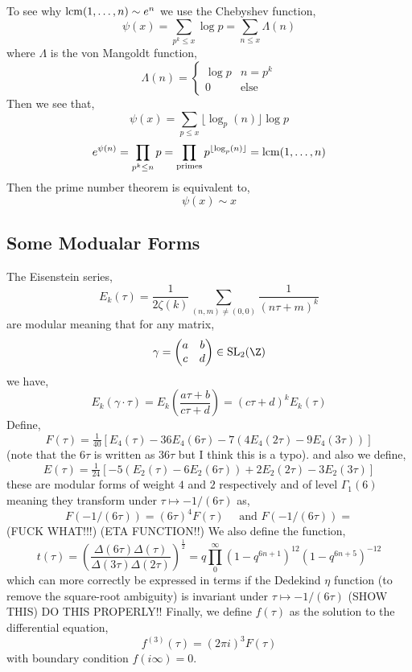 \documentclass[12pt]{article}
\begin{document}
\begin{rmk}
To see why $\mathrm{lcm}{(1, \dots, n)} \sim e^n$ we use the Chebyshev function,
\[ \psi(x) = \sum_{p^k \le x} \log{p} = \sum_{n \le x} \Lambda(n) \]
where $\Lambda$ is the von Mangoldt function,
\[ \Lambda(n) = 
\begin{cases}
\log{p} & n = p^k
\\
0 & \text{else}
\end{cases} \]
Then we see that,
\[ \psi(x) = \sum_{p \le x} \lfloor \log_p(n) \rfloor \log{p} \]
\[ e^{\psi(n)} = \prod_{p^k \le n} p = \prod_{\text{primes}} p^{\lfloor \log_p(n) \rfloor} = \mathrm{lcm}{(1, \dots, n)} \]
Then the prime number theorem is equivalent to,
\[ \psi(x) \sim x \]
\end{rmk}

\subsection{Some Modualar Forms}

The Eisenstein series,
\[ E_{k}(\tau) = \frac{1}{2 \zeta(k)} \sum_{(n,m) \neq (0,0)} \frac{1}{(n \tau + m)^k} \]
are modular meaning that for any matrix,
\[ \gamma = \begin{pmatrix}
a & b 
\\
c & d
\end{pmatrix}
\in \mathrm{SL}_2(\Z) \]
we have,
\[ E_k(\gamma \cdot \tau) = E_k\left(\frac{a \tau + b}{c \tau + d} \right)  = (c \tau + d)^k E_k(\tau) \]
Define,
\[ F(\tau) = \tfrac{1}{40} \left[ E_4(\tau) - 36 E_4(6 \tau) - 7 (4 E_4(2 \tau) - 9 E_4(3 \tau)) \right] \]
(note that the $6 \tau$ is written as $36 \tau$ but I think this is a typo). 
and also we define,
\[ E(\tau) = \tfrac{1}{24} \left[ -5 (E_2(\tau) - 6 E_2(6 \tau)) + 2 E_2(2 \tau) - 3 E_2(3 \tau) \right] \]
these are modular forms of weight $4$ and $2$ respectively and of level $\Gamma_1(6)$ meaning they transform under $\tau \mapsto -1/(6 \tau)$ as,
\[ F(-1/(6 \tau)) = (6 \tau)^4 F(\tau) \quad \text{ and } F(-1/(6 \tau)) = \](FUCK WHAT!!!)
(ETA FUNCTION!!)
We also define the function,
\[ t(\tau) = \left( \frac{\Delta(6 \tau) \Delta(\tau)}{\Delta(3 \tau) \Delta(2 \tau)} \right)^{\frac{1}{2}} = q \prod_0^{\infty} (1 - q^{6 n + 1})^{12} (1 - q^{6n+5})^{-12} \]
which can more correctly be expressed in terms if the Dedekind $\eta$ function (to remove the square-root ambiguity) is invariant under $\tau \mapsto -1/(6 \tau)$ (SHOW THIS)
DO THIS PROPERLY!!
Finally, we define $f(\tau)$ as the solution to the differential equation,
\[ f^{(3)}(\tau) = (2\pi i)^3 F(\tau) \]
with boundary condition $f(i \infty) = 0$.
\end{document}
